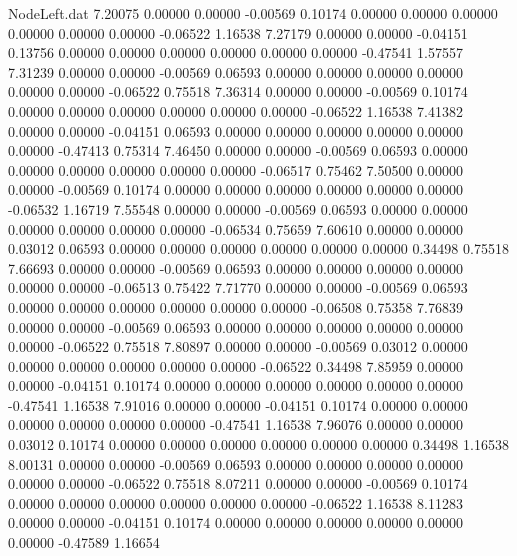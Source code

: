 \begin{filecontents}{NodeLeft.dat}
   7.20075    0.00000    0.00000    -0.00569    0.10174    0.00000    0.00000    0.00000    0.00000    0.00000    0.00000   -0.06522    1.16538
   7.27179    0.00000    0.00000    -0.04151    0.13756    0.00000    0.00000    0.00000    0.00000    0.00000    0.00000   -0.47541    1.57557
   7.31239    0.00000    0.00000    -0.00569    0.06593    0.00000    0.00000    0.00000    0.00000    0.00000    0.00000   -0.06522    0.75518
   7.36314    0.00000    0.00000    -0.00569    0.10174    0.00000    0.00000    0.00000    0.00000    0.00000    0.00000   -0.06522    1.16538
   7.41382    0.00000    0.00000    -0.04151    0.06593    0.00000    0.00000    0.00000    0.00000    0.00000    0.00000   -0.47413    0.75314
   7.46450    0.00000    0.00000    -0.00569    0.06593    0.00000    0.00000    0.00000    0.00000    0.00000    0.00000   -0.06517    0.75462
   7.50500    0.00000    0.00000    -0.00569    0.10174    0.00000    0.00000    0.00000    0.00000    0.00000    0.00000   -0.06532    1.16719
   7.55548    0.00000    0.00000    -0.00569    0.06593    0.00000    0.00000    0.00000    0.00000    0.00000    0.00000   -0.06534    0.75659
   7.60610    0.00000    0.00000     0.03012    0.06593    0.00000    0.00000    0.00000    0.00000    0.00000    0.00000    0.34498    0.75518
   7.66693    0.00000    0.00000    -0.00569    0.06593    0.00000    0.00000    0.00000    0.00000    0.00000    0.00000   -0.06513    0.75422
   7.71770    0.00000    0.00000    -0.00569    0.06593    0.00000    0.00000    0.00000    0.00000    0.00000    0.00000   -0.06508    0.75358
   7.76839    0.00000    0.00000    -0.00569    0.06593    0.00000    0.00000    0.00000    0.00000    0.00000    0.00000   -0.06522    0.75518
   7.80897    0.00000    0.00000    -0.00569    0.03012    0.00000    0.00000    0.00000    0.00000    0.00000    0.00000   -0.06522    0.34498
   7.85959    0.00000    0.00000    -0.04151    0.10174    0.00000    0.00000    0.00000    0.00000    0.00000    0.00000   -0.47541    1.16538
   7.91016    0.00000    0.00000    -0.04151    0.10174    0.00000    0.00000    0.00000    0.00000    0.00000    0.00000   -0.47541    1.16538
   7.96076    0.00000    0.00000     0.03012    0.10174    0.00000    0.00000    0.00000    0.00000    0.00000    0.00000    0.34498    1.16538
   8.00131    0.00000    0.00000    -0.00569    0.06593    0.00000    0.00000    0.00000    0.00000    0.00000    0.00000   -0.06522    0.75518
   8.07211    0.00000    0.00000    -0.00569    0.10174    0.00000    0.00000    0.00000    0.00000    0.00000    0.00000   -0.06522    1.16538
   8.11283    0.00000    0.00000    -0.04151    0.10174    0.00000    0.00000    0.00000    0.00000    0.00000    0.00000   -0.47589    1.16654

\end{filecontents}
